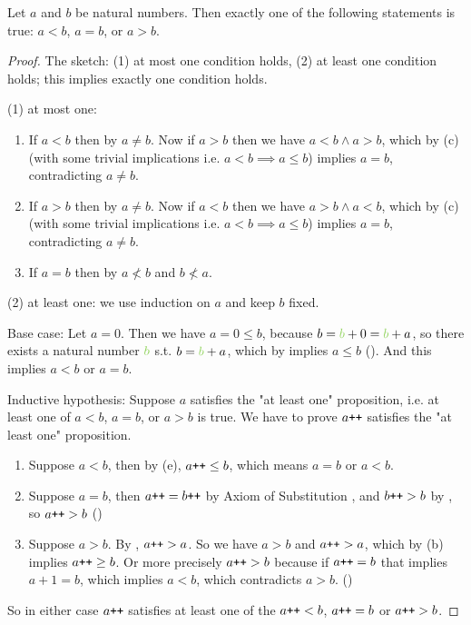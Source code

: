 \begin{proposition} \label{prop 2.2.13}
Let \(a\) and \(b\) be natural numbers. Then exactly one of the following statements is true: \(a < b\), \(a = b\), or \(a > b\).
\end{proposition}
\begin{proof}
The sketch: (1) at most one condition holds, (2) at least one condition holds; this implies exactly one condition holds.

(1) at most one:
    \begin{enumerate}
        \item If \(a < b\) then by  \(a \neq b\). Now if \(a > b\) then we have \(a < b \land a > b\), which by (c) (with some trivial implications i.e. \(a < b \implies a \leq b\)) implies \(a = b\), contradicting \(a \neq b\).
        \item If \(a > b\) then by  \(a \neq b\). Now if \(a < b\) then we have \(a > b \land a < b\), which by (c) (with some trivial implications i.e. \(a < b \implies a \leq b\)) implies \(a = b\), contradicting \(a \neq b\).
        \item If \(a = b\) then by  \(a \not < b \) and \(b \not < a\).
    \end{enumerate}

(2) at least one: we use induction on \(a\) and keep \(b\) fixed.

Base case: Let \(a = 0\). Then we have \(a = 0 \leq b\), because \(b = \GREEN{b} + 0 = \GREEN{b} + a\), so there exists a natural number \(\GREEN{b}\) s.t. \(b = \GREEN{b} + a\), which by  implies \(a \leq b\) (). And this implies \(a < b\) or \(a = b\).

Inductive hypothesis: Suppose \(a\) satisfies the "at least one" proposition, i.e. at least one of \(a < b\), \(a = b\), or \(a > b\) is true. We have to prove \(a\texttt{++}\) satisfies the "at least one" proposition.
    \begin{enumerate}
        \item Suppose \(a < b\), then by (e), \(a\texttt{++} \leq b\), which means \(a = b\) or \(a < b\).
        \item Suppose \(a = b\), then \(a\texttt{++} = b\texttt{++}\) by Axiom of Substitution , and \(b\texttt{++} > b\) by , so \(a\texttt{++} > b\) ()
        \item Suppose \(a > b\). By , \(a\texttt{++} > a\). So we have \(a > b\) and \(a\texttt{++} > a\), which by (b) implies \(a\texttt{++} \geq b\). Or more precisely \(a\texttt{++} > b\) because if \(a\texttt{++} = b\) that implies \(a + 1 = b\), which implies \(a < b\), which contradicts \(a > b\). ()
    \end{enumerate}
So in either case \(a\texttt{++}\) satisfies at least one of the \(a\texttt{++} < b\), \(a\texttt{++} = b\) or \(a\texttt{++} > b\).
\end{proof}

